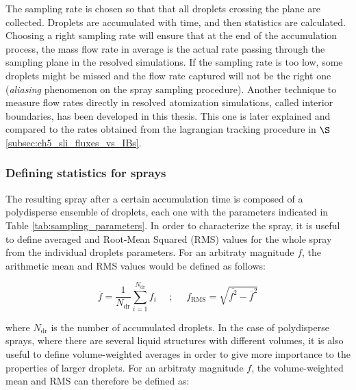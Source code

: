 The sampling rate is chosen so that that all droplets crossing the plane are collected. Droplets are accumulated with time, and then statistics are calculated. Choosing a right sampling rate will ensure that at the end of the accumulation process, the mass flow rate in average is the actual rate passing through the sampling plane in the resolved simulations. If the sampling rate is too low, some droplets might be missed and the flow rate captured will not be the right one (\textit{aliasing} phenomenon on the spray sampling procedure). Another technique to measure flow rates directly in resolved atomization simulations, called interior boundaries, has been developed in this thesis. This one is later explained and compared to the rates obtained from the lagrangian tracking procedure in $\S$ \ref{subsec:ch5_sli_fluxes_vs_IBs}. \\

\subsubsection*{Defining statistics for sprays}

The resulting spray after a certain accumulation time is composed of a polydisperse ensemble of droplets, each one with the parameters indicated in Table \ref{tab:sampling_parameters}. In order to characterize the spray, it is useful to define averaged and Root-Mean Squared (RMS) values for the whole spray from the individual droplets parameters. For an arbitraty magnitude $f$, the arithmetic mean and RMS values would be defined as follows:

\begin{equation}
\label{eq:ch4_f_arbitrary_mean_RMS_definition}
\overline{f} = \frac{1}{N_\mathrm{dr}} \sum_{i=1}^{N_\mathrm{dr}} f_i  ~~~~~~ ; ~~~~~~ f_\mathrm{RMS} = \sqrt{\overline{f^2} - \overline{f}^2}
\end{equation}


where $N_\mathrm{dr}$ is the number of accumulated droplets. In the case of polydisperse sprays, where there are several liquid structures with different volumes, it is also useful to define volume-weighted averages in order to give more importance to the properties of larger droplets. For an arbitraty magnitude $f$, the volume-weighted mean and RMS can therefore be defined as:


